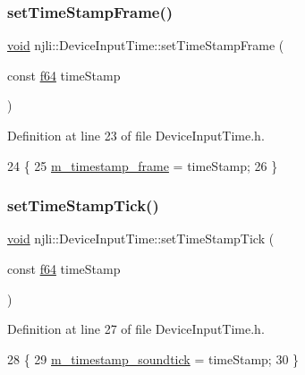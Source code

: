 \subsubsection{\texorpdfstring{set\+Time\+Stamp\+Frame()}{setTimeStampFrame()}}
{\footnotesize\ttfamily \mbox{\hyperlink{_thread_8h_af1e856da2e658414cb2456cb6f7ebc66}{void}} njli\+::\+Device\+Input\+Time\+::set\+Time\+Stamp\+Frame (\begin{DoxyParamCaption}\item[{const \mbox{\hyperlink{_util_8h_a94dab5770726ccbef8c7d026cfbdf8e5}{f64}}}]{time\+Stamp }\end{DoxyParamCaption})\hspace{0.3cm}{\ttfamily [inline]}}



Definition at line 23 of file Device\+Input\+Time.\+h.


\begin{DoxyCode}
24     \{
25       \mbox{\hyperlink{classnjli_1_1_device_input_time_a798d29d739522cad83bd37986ed15a20}{m\_timestamp\_frame}} = timeStamp;
26     \}
\end{DoxyCode}
\mbox{\label{classnjli_1_1_device_input_time_a6a06c7800f1925631dafb54671b2abd7}} 
\subsubsection{\texorpdfstring{set\+Time\+Stamp\+Tick()}{setTimeStampTick()}}
{\footnotesize\ttfamily \mbox{\hyperlink{_thread_8h_af1e856da2e658414cb2456cb6f7ebc66}{void}} njli\+::\+Device\+Input\+Time\+::set\+Time\+Stamp\+Tick (\begin{DoxyParamCaption}\item[{const \mbox{\hyperlink{_util_8h_a94dab5770726ccbef8c7d026cfbdf8e5}{f64}}}]{time\+Stamp }\end{DoxyParamCaption})\hspace{0.3cm}{\ttfamily [inline]}}



Definition at line 27 of file Device\+Input\+Time.\+h.


\begin{DoxyCode}
28     \{
29       \mbox{\hyperlink{classnjli_1_1_device_input_time_a20e05f326dd3a3836a549cba6b536e85}{m\_timestamp\_soundtick}} = timeStamp;
30     \}
\end{DoxyCode}


